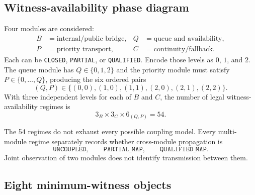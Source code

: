 \documentclass[11pt]{article}
\begin{document}
\subsection{Witness-availability phase diagram}

Four modules are considered:
\begin{align}
B&=\text{internal/public bridge}, & Q&=\text{queue and availability},\\
P&=\text{priority transport}, & C&=\text{continuity/fallback}.
\end{align}
Each can be \texttt{CLOSED}, \texttt{PARTIAL}, or \texttt{QUALIFIED}. Encode those levels as $0$, $1$, and $2$. The queue module has $Q\in\{0,1,2\}$ and the priority module must satisfy $P\in\{0,\ldots,Q\}$, producing the six ordered pairs
\begin{equation}
(Q,P)\in\{(0,0),(1,0),(1,1),(2,0),(2,1),(2,2)\}.
\end{equation}
With three independent levels for each of $B$ and $C$, the number of legal witness-availability regimes is
\begin{equation}
3_B\times3_C\times6_{(Q,P)}=54.
\end{equation}

The 54 regimes do not exhaust every possible coupling model. Every multi-module regime separately records whether cross-module propagation is
\begin{equation}
\texttt{UNCOUPLED},\qquad
\texttt{PARTIAL\_MAP},\qquad
\texttt{QUALIFIED\_MAP}.
\end{equation}
Joint observation of two modules does not identify transmission between them.

\subsection{Eight minimum-witness objects}
\end{document}
